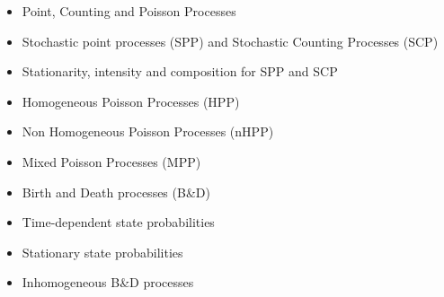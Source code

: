 \documentclass[10pt]{article}
\begin{document}
\begin{itemize}
	\item Point, Counting and Poisson Processes 
	\item Stochastic point processes (SPP) and Stochastic Counting Processes (SCP) 
	\item Stationarity, intensity and composition for SPP and SCP 
	\item Homogeneous Poisson Processes (HPP) 
	\item Non Homogeneous Poisson Processes (nHPP) 
	\item Mixed Poisson Processes (MPP) 
	\item Birth and Death processes (B\&D) 
	\item Time-dependent state probabilities 
	\item Stationary state probabilities 
	\item Inhomogeneous B\&D processes 
\end{itemize}
\begin{refsection}
	\nocite{baldi2007calcolo}
	\nocite{beichelt2006stochastic}
	\printbibliography[heading=subbibliography]
\end{refsection}
\end{document}
